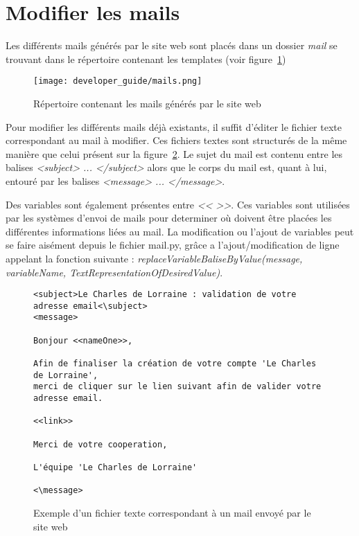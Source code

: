 \section{Modifier les mails}

Les différents mails générés par le site web sont placés dans un dossier \textit{mail} se trouvant dans le répertoire contenant les templates (voir figure~\ref{fig:Répertoire contenant les mails générés par le site web})

\begin{figure}[!ht]
    \centering
    \texttt{[image: developer\_guide/mails.png]}
    \caption{Répertoire contenant les mails générés par le site web}
    \label{fig:Répertoire contenant les mails générés par le site web}
\end{figure}
\FloatBarrier

Pour modifier les différents mails déjà existants, il suffit d'éditer le fichier texte correspondant au mail à modifier. Ces fichiers textes sont structurés de la même manière que celui présent sur la figure~\ref{fig:Exemple d'un fichier texte correspondant à un mail envoyé par le site web}. Le sujet du mail est contenu entre les balises \textit{<subject> ... </subject>} alors que le corps du mail est, quant à lui, entouré par les balises \textit{<message> ... </message>}.\newline

Des variables sont également présentes entre \textit{<< >>}. Ces variables sont 
utilisées par les systèmes d'envoi de mails pour determiner où doivent être placées 
les différentes informations liées au mail. La modification ou l'ajout de variables 
peut se faire aisément depuis le fichier mail.py, grâce a l'ajout/modification de 
ligne appelant la fonction suivante : \textit{replaceVariableBaliseByValue(message, 
variableName, TextRepresentationOfDesiredValue)}.

\begin{figure}[!ht]
\begin{framed}
\begin{verbatim}
<subject>Le Charles de Lorraine : validation de votre adresse email<\subject>
<message>

Bonjour <<nameOne>>,

Afin de finaliser la création de votre compte 'Le Charles de Lorraine',  
merci de cliquer sur le lien suivant afin de valider votre adresse email.

<<link>>
	
Merci de votre cooperation,

L'équipe 'Le Charles de Lorraine'

<\message>
\end{verbatim}
\end{framed}
    \caption{Exemple d'un fichier texte correspondant à un mail envoyé par le site web}
    \label{fig:Exemple d'un fichier texte correspondant à un mail envoyé par le site web}
\end{figure}
\FloatBarrier

